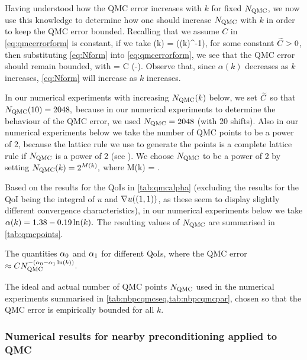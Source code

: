 Having understood how the QMC error increases with $k$ for fixed $N_{\mathrm{QMC}}$, we now use this knowledge to determine how one should increase $N_{\mathrm{QMC}}$ with $k$ in order to keep the QMC error bounded. Recalling that we assume $C$ in \cref{eq:qmcerrorform} is constant, if we take
\beq\label{eq:Nform}
\NQMC(k) = \exp\mleft(\Ctilde \alpha(k)^{-1}\mright),
\eeq
for some constant $\widetilde{C} > 0$, then substituting \cref{eq:Nform} into \cref{eq:qmcerrorform}, we see that the QMC error should remain bounded, with
\beqs
{} = C \exp\mleft(-\Ctilde\mright).
\eeqs
Observe that, since $\alpha(k)$ decreases as $k$ increases, \cref{eq:Nform} will increase as $k$ increases.

In our numerical experiments with increasing $N_{\mathrm{QMC}}(k)$ below, we set $\widetilde{C}$ so that $N_{\mathrm{QMC}}(10) = 2048,$ because in our numerical experiments to determine the behaviour of the QMC error, we used $N_{\mathrm{QMC}} = 2048$ (with 20 shifts). Also in our numerical experiments below we take the number of QMC points to be a power of 2, because the lattice rule we use to generate the points is a complete lattice rule if $N_{\mathrm{QMC}}$ is a power of 2 (see \cite{NuREADME}). We choose $N_{\mathrm{QMC}}$ to be a power of 2 by setting $N_{\mathrm{QMC}}(k) = 2^{M(k)},$ where
\beqs
M(k) = .
\eeqs

Based on the results for the QoIs in \cref{tab:qmcalpha} (excluding the results for the QoI being the integral of $u$ and $\nabla u((1,1))$, as these seem to display slightly different convergence characteristics), in our numerical experiments below we take $\alpha(k) = 1.38 - 0.19  \operatorname{ln}(k).$ The resulting values of $N_{\mathrm{QMC}}$ are summarised in \cref{tab:qmcpoints}.

\begin{table}[h!]
  \centering
  
  \caption{The quantities $\alpha_{0}$ and $\alpha_{1}$ for different QoIs, where the QMC error $\approx C \NQMC^{-\mleft(\alphaz - \alphao\loge(k)\mright)}$.}\label{tab:qmcalpha}
  \end{table}


\begin{table}[h]
  \centering
  
  \caption{The ideal and actual number of QMC points $N_{\mathrm{QMC}}$ used in the numerical experiments summarised in \cref{tab:nbpcqmcseq,tab:nbpcqmcpar}, chosen so that the QMC error is empirically bounded for all $k$.\label{tab:qmcpoints}}
  \end{table}

\subsubsection{Numerical results for nearby preconditioning applied to QMC}

